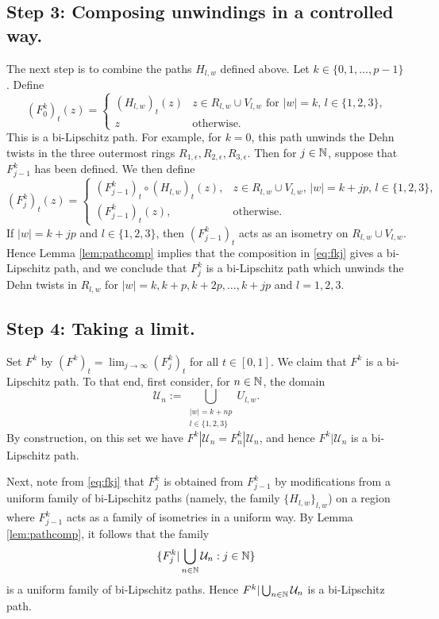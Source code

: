 \documentclass{amsart}
\begin{document}
\subsection{Step 3: Composing unwindings in a controlled way.}
The next step is to combine the paths $H_{l,w}$ defined above. Let $k \in \{0,1,\ldots, p-1 \}$. Define 
\begin{equation*}
(F^k_0)_t(z) = 
\begin{cases}
(H_{l,w})_t(z) & \text{$z\in  R_{l,w} \cup V_{l,w}$ for $|w| = k$, $l \in \{1,2,3\}$,} \\
z & \text{otherwise.} \end{cases}
\end{equation*}
This is a bi-Lipschitz path.
For example, for $k=0$, this path unwinds the Dehn twists in the three outermost rings $R_{1,\epsilon}, R_{2,\epsilon}, R_{3,\epsilon}$. Then for $j\in \mathbb{N}$, suppose that $F^k_{j-1}$ has been defined. We then define
\begin{equation}
\label{eq:fkj}
(F^k_j)_t(z) = 
\begin{cases}
(F^k_{j-1})_t \circ ( H_{l,w})_t (z), & \text{$z\in R_{l,w}\cup V_{l,w}$, $|w| = k+jp$, $l\in \{1,2,3\}$,}\\
(F^k_{j-1})_t(z), & \text{otherwise.} \end{cases}
\end{equation}
If $|w| = k+jp$ and $l \in \{1,2,3\}$, then $(F^k_{j-1})_t$ acts as an isometry on $R_{l,w} \cup V_{l,w}$. 
Hence Lemma \ref{lem:pathcomp} implies that the composition in \eqref{eq:fkj} gives a bi-Lipschitz path, and we conclude that $F^k_j$ is a bi-Lipschitz path which unwinds the Dehn twists in $R_{l,w}$ for $|w| = k, k+p, k+2p,\ldots, k+jp$ and $l=1,2,3$.




\subsection{Step 4: Taking a limit.}
Set $F^k$ by $(F^k)_t = \lim_{j\to \infty} (F^k_j)_t$ for all $t\in [0,1]$. We claim that $F^k$ is a bi-Lipschitz path. To that end, first consider, for $n\in \mathbb{N}$, the domain
\[ \mathcal{U}_n := \bigcup_{\substack{|w| = k+np\\ l \in \{1,2,3\}}} U_{l,w}.\]
By construction, on this set we have $F^k|\mathcal{U}_n = F^k_n|\mathcal{U}_n$, and hence $F^k|\mathcal{U}_n$ is a bi-Lipschitz path. 

Next, note from \eqref{eq:fkj} that $F^k_j$ is obtained from $F^k_{j-1}$ by modifications from a uniform family of bi-Lipschitz paths (namely, the family $\{H_{l,w}\}_{l,w}$) on a region where $F^k_{j-1}$ acts as a family of isometries in a uniform way. By Lemma \ref{lem:pathcomp}, it follows that the family 
\[ \{ F^k_j|\bigcup_{n\in \mathbb{N}} \mathcal{U}_n : j\in \mathbb{N} \}\] 
is a uniform family of bi-Lipschitz paths. Hence $F^k|\bigcup_{n\in \mathbb{N} } \mathcal{U}_n$ is a bi-Lipschitz path.
\end{document}
